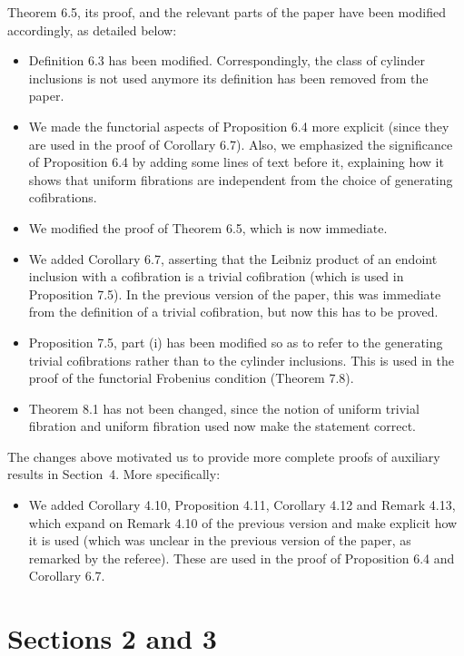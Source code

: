 \documentclass[reqno,10pt,a4paper,oneside,draft]{amsart}
\begin{document}
Theorem 6.5, its proof, and the relevant parts of the paper have been modified accordingly, as detailed below:

\begin{itemize} 
\item Definition 6.3 has been modified. Correspondingly, the class of cylinder inclusions is not used anymore 
its definition has been removed from the paper. 
\item We made the functorial aspects of Proposition 6.4 more explicit  (since they are used in the proof of Corollary 6.7). 
Also, we emphasized the significance of Proposition 6.4 by adding some lines of text before it, explaining how it shows that uniform fibrations are independent from the choice of generating
cofibrations. 
\item We modified the proof of Theorem 6.5, which is now immediate. 
\item We added Corollary 6.7, asserting that the Leibniz product of an endoint inclusion with a cofibration is
a trivial cofibration (which is used in Proposition 7.5).  In the previous version of the paper, this was immediate from the definition of a trivial cofibration, but now this has to be proved. 
\item Proposition 7.5, part (i) has been modified so as to refer to the generating trivial cofibrations rather than to the cylinder inclusions. This is used in the proof of the functorial Frobenius condition (Theorem 7.8).
\item Theorem 8.1 has not been changed, since the notion of uniform trivial fibration and uniform fibration used now
make the statement correct. 
\end{itemize} 

The changes above motivated us to provide more complete proofs of auxiliary results in Section~4. More specifically: 
\begin{itemize}
\item We added Corollary 4.10, Proposition 4.11, Corollary 4.12 and Remark 4.13, which expand on Remark 4.10 of the previous version 
and make explicit how it is used (which was unclear in the previous version of the paper, as remarked by the referee). These are used in the proof of 
Proposition 6.4 and Corollary 6.7. 
\end{itemize}


\section*{Sections 2 and 3} 
\end{document}
